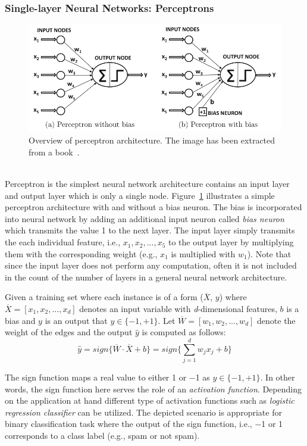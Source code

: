 \subsubsection{Single-layer Neural Networks: Perceptrons}
\begin{figure}[t]
\centering
 \includegraphics[width=\linewidth]{Figures/fig_perceptron.png}
 \caption{Overview of perceptron architecture. The image has been extracted from a book~\protect\cite{DBLP:books/sp/Aggarwal18}.}
 \label{fig:perceptron}
\end{figure} \\
Perceptron is the simplest neural network architecture contains an input layer and output layer which is only a single node. Figure~\ref{fig:perceptron} illustrates a simple perceptron architecture with and without a bias neuron. The bias is incorporated into neural network by adding an additional input neuron called \textit{bias neuron}  which transmits the value 1 to the next layer. The input layer simply transmits the each individual feature, i.e., $x_1, x_2, ..., x_5$ to the output layer by multiplying them with the corresponding weight (e.g., $x_1$ is multiplied with $w_1$). Note that since the input layer does not perform any computation, often it is not included in the count of the number of layers in a general neural network architecture.

Given a training set where each instance is of a form ($\overline{X}$, $y$) where $\overline{X}=[x_1,x_2,...,x_d]$ denotes an input variable with \textit{d}-dimensional features, $b$ is a bias and $y$ is an output that $y \in{\{-1, +1\}}$. Let $\overline{W}=[w_1,w_2,...,w_d]$ denote the weight of the edges and the output $\hat{y}$ is computed as follows: \begin{equation}
\hat{y}=sign\{ \overline{W}\cdot \overline{X}+b\} = sign\{ \sum\limits_{j=1}^{d} w_jx_j+b\}
\end{equation}


The sign function maps a real value to either \num{+1} or \num{-1} as $y \in{\{-1, +1\}}$. In other words, the sign function here serves the role of an \textit{activation function}. Depending on the application at hand different type of activation functions such as \textit{logistic regression classifier} can be utilized. The depicted scenario is appropriate for binary classification task where the output of the sign function, i.e., \num{-1} or \num{+1} corresponds to a class label (e.g., spam or not spam). 


